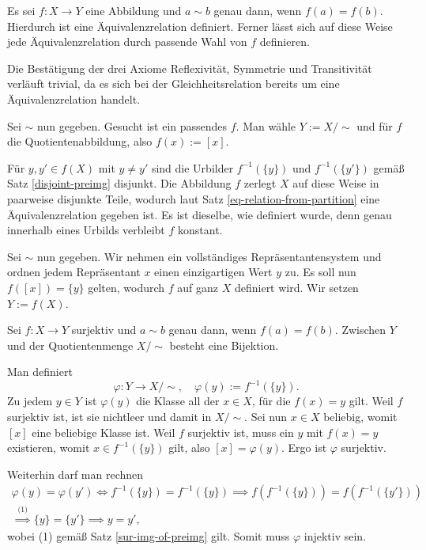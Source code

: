 \begin{Satz}
Es sei $f\colon X\to Y$ eine Abbildung und $a\sim b$ genau dann,
wenn $f(a)=f(b)$. Hierdurch ist eine Äquivalenzrelation definiert.
Ferner lässt sich auf diese Weise jede Äquivalenzrelation durch
passende Wahl von $f$ definieren.
\end{Satz}
\begin{Beweis}[Beweis 1]
Die Bestätigung der drei Axiome Reflexivität, Symmetrie und
Transitivität verläuft trivial, da es sich bei der Gleichheitsrelation
bereits um eine Äquivalenzrelation handelt.

Sei ${\sim}$ nun gegeben. Gesucht ist ein passendes $f$. Man wähle
$Y:=X/{\sim}$ und für $f$ die Quotientenabbildung, also $f(x):=[x]$.\,\qedsymbol
\end{Beweis}
\begin{Beweis}[Beweis 2]
Für $y,y'\in f(X)$ mit $y\ne y'$ sind die Urbilder $f^{-1}(\{y\})$ und
$f^{-1}(\{y'\})$ gemäß Satz \ref{disjoint-preimg} disjunkt. Die
Abbildung $f$ zerlegt $X$ auf diese Weise in paarweise disjunkte
Teile, wodurch laut Satz \ref{eq-relation-from-partition} eine
Äquivalenzrelation gegeben ist. Es ist dieselbe, wie definiert
wurde, denn genau innerhalb eines Urbilds verbleibt $f$ konstant.

Sei ${\sim}$ nun gegeben. Wir nehmen ein vollständiges
Repräsentantensystem und ordnen jedem Repräsentant $x$ einen
einzigartigen Wert $y$ zu. Es soll nun $f([x])=\{y\}$ gelten,
wodurch $f$ auf ganz $X$ definiert wird. Wir setzen
$Y:=f(X)$.\,\qedsymbol
\end{Beweis}

\begin{Satz}
Sei $f\colon X\to Y$ surjektiv und $a\sim b$ genau dann, wenn
$f(a)=f(b)$. Zwischen $Y$ und der Quotientenmenge $X/{\sim}$
besteht eine Bijektion.
\end{Satz}
\begin{Beweis}[Beweis 1]
Man definiert
\[\varphi\colon Y\to X/{\sim},\quad \varphi(y):=f^{-1}(\{y\}).\]
Zu jedem $y\in Y$ ist $\varphi(y)$ die Klasse all der $x\in X$, für
die $f(x)=y$ gilt. Weil $f$ surjektiv ist, ist sie nichtleer und damit
in $X/{\sim}$. Sei nun $x\in X$ beliebig, womit $[x]$ eine beliebige
Klasse ist. Weil $f$ surjektiv ist, muss ein $y$ mit $f(x)=y$ existieren,
womit $x\in f^{-1}(\{y\})$ gilt, also $[x] = \varphi(y)$. Ergo ist
$\varphi$ surjektiv.

Weiterhin darf man rechnen
\begin{gather*}
\varphi(y) = \varphi(y') \iff f^{-1}(\{y\}) = f^{-1}(\{y\})
\implies f(f^{-1}(\{y\})) = f(f^{-1}(\{y'\}))\\
\stackrel{\text{(1)}}\implies \{y\} = \{y'\} \implies y=y',
\end{gather*}
wobei (1) gemäß Satz \ref{sur-img-of-preimg} gilt. Somit muss
$\varphi$ injektiv sein.\,\qedsymbol
\end{Beweis}

